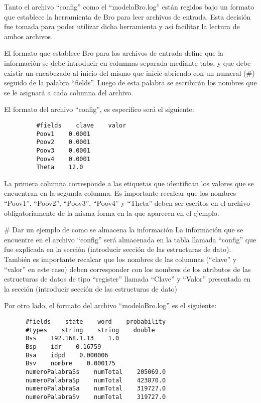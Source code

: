 Tanto el archivo “config” como el “modeloBro.log” están regidos bajo un formato que establece la herramienta de Bro para leer archivos de entrada. Esta decisión fue tomada para poder utilizar dicha herramienta y así facilitar la lectura de ambos archivos.

El formato que establece Bro para los archivos de entrada define que la información se debe introducir en columnas separada mediante tabs, y que debe existir un encabezado al inicio del mismo que inicie abriendo con un numeral (\#) seguido de la palabra “fields”. Luego de esta palabra se escribirán los nombres que se le asignará a cada columna del archivo.

El formato del archivo “config”, es específico será el siguiente:

\begin{verbatim}
         #fields    clave    valor
         Poov1    0.0001
         Poov2    0.0001
         Poov3    0.0001
         Poov4    0.0001
         Theta    12.0
\end{verbatim}

La primera columna corresponde a las etiquetas que identifican los valores que se encuentran en la segunda columna. Es importante recalcar que los nombres “Poov1”, “Poov2”, “Poov3”, “Poov4” y “Theta” deben ser escritos en el archivo obligatoriamente de la misma forma en la que aparecen en el ejemplo.

\# Dar un ejemplo de como se almacena la información
La información que se encuentre en el archivo “config” será almacenada en  la tabla llamada “config” que fue explicada en la sección (introducir sección de las estructuras de dato). También es importante recalcar que los nombres de las columnas (“clave” y “valor” en este caso) deben corresponder con los nombres de los atributos de las estructuras de datos de tipo “register” llamada “Clave” y “Valor” presentada en la sección (introducir sección de las estructuras de dato)

Por otro lado, el formato del archivo “modeloBro.log” es el siguiente:

\begin{verbatim}
      #fields    state    word    probability
      #types    string    string    double
      Bss    192.168.1.13    1.0
      Bsp    idr    0.16759
      Bsa    idpd    0.000006
      Bsv    nombre    0.000175
      numeroPalabraSs    numTotal    205069.0
      numeroPalabraSp    numTotal    423870.0
      numeroPalabraSa    numTotal    319727.0
      numeroPalabraSv    numTotal    319727.0
\end{verbatim}

